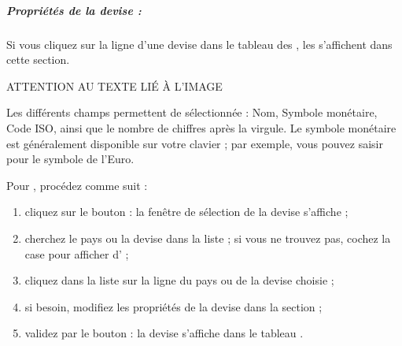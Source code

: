 


\subparagraph{Propriétés de la devise :\label{setup-resources-currencies-properties}}

Si vous cliquez sur la ligne d'une devise dans le tableau des , les  s'affichent dans cette section.

ATTENTION AU TEXTE LIÉ À L'IMAGE


Les différents champs permettent de  sélectionnée : Nom, Symbole monétaire, Code ISO, ainsi que le nombre de chiffres après la virgule. Le symbole monétaire est généralement disponible sur votre clavier ; par exemple, vous pouvez saisir  pour le symbole de l'Euro.


\ifIllustration
\else
\fi
Pour , procédez comme suit :

\begin{enumerate}
	\item cliquez sur le bouton  : la fenêtre de sélection de la devise s'affiche ;
	\item cherchez le pays ou la devise dans la liste ; si vous ne trouvez pas, cochez la case  pour afficher d' ;
	\item cliquez dans la liste sur la ligne du pays ou de la devise choisie ;
	\item  si besoin, modifiez les propriétés de la devise dans la section  ;
	\item validez par le bouton  : la devise s'affiche dans le tableau .
\end{enumerate}

